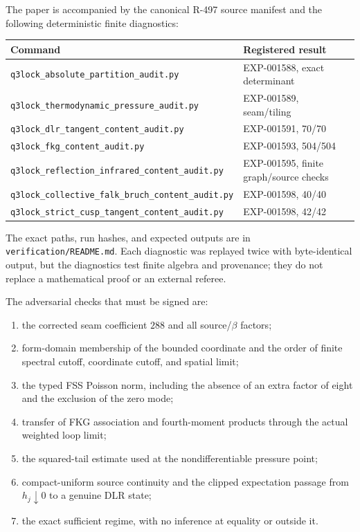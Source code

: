 \documentclass[11pt]{article}
\numberwithin{equation}{section}
\theoremstyle{definition}
\begin{document}
The paper is accompanied by the canonical R-497 source manifest and the
following deterministic finite diagnostics:
\begin{center}
\begin{tabular}{p{}p{}}
\toprule
Command & Registered result\\
\midrule
\texttt{q3lock\_absolute\_partition\_audit.py} & EXP-001588, exact determinant\\
\texttt{q3lock\_thermodynamic\_pressure\_audit.py} & EXP-001589, seam/tiling\\
\texttt{q3lock\_dlr\_tangent\_content\_audit.py} & EXP-001591, 70/70\\
\texttt{q3lock\_fkg\_content\_audit.py} & EXP-001593, 504/504\\
\texttt{q3lock\_reflection\_infrared\_content\_audit.py} & EXP-001595, finite graph/source checks\\
\texttt{q3lock\_collective\_falk\_bruch\_content\_audit.py} & EXP-001598, 40/40\\
\texttt{q3lock\_strict\_cusp\_tangent\_content\_audit.py} & EXP-001598, 42/42\\
\bottomrule
\end{tabular}
\end{center}
The exact paths, run hashes, and expected outputs are in
\texttt{verification/README.md}.  Each diagnostic was replayed twice with
byte-identical output, but the diagnostics test finite algebra and provenance;
they do not replace a mathematical proof or an external referee.

The adversarial checks that must be signed are:
\begin{enumerate}[leftmargin=2.3em]
\item the corrected seam coefficient $288$ and all source/$\beta$ factors;
\item form-domain membership of the bounded coordinate and the order of
      finite spectral cutoff, coordinate cutoff, and spatial limit;
\item the typed FSS Poisson norm, including the absence of an extra factor of
      eight and the exclusion of the zero mode;
\item transfer of FKG association and fourth-moment products through the
      actual weighted loop limit;
\item the squared-tail estimate used at the nondifferentiable pressure point;
\item compact-uniform source continuity and the clipped expectation passage
      from $h_j\downarrow0$ to a genuine DLR state;
\item the exact sufficient regime, with no inference at equality or outside
      it.
\end{enumerate}
\end{document}
